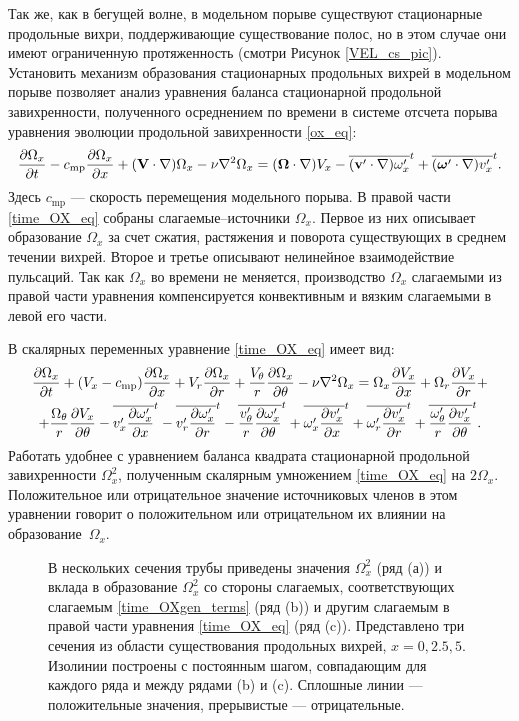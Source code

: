 Так же, как в бегущей волне, в модельном порыве существуют стационарные продольные  вихри, поддерживающие существование полос, но в этом случае они имеют ограниченную протяженность (смотри Рисунок \ref{VEL_cs_pic}). Установить механизм образования стационарных продольных вихрей в модельном порыве позволяет анализ уравнения баланса стационарной продольной завихренности, полученного осреднением по времени в системе отсчета порыва уравнения эволюции продольной завихренности \eqref{ox_eq}: 
\begin{equation} \label{time_OX_eq}
\frac{\partial \Omega_x}{\partial t} - c_\mathrm{mp} \frac{\partial \Omega_x}{\partial x} + (\mathbf{V} \cdot \nabla) \Omega_x - \nu\nabla^2 \Omega_x = (\mbox{\boldmath$\Omega$} \cdot \nabla) V_x - \overline{(\mathbf{v}' \cdot \nabla) \omega'_x}^t + \overline{(\mbox{\boldmath$\omega$}' \cdot \nabla) v'_x}^t.
\end{equation}
Здесь $c_\mathrm{mp}$ --- скорость перемещения модельного порыва. В правой части \eqref{time_OX_eq} собраны слагаемые--источники $\Omega_x$. Первое из них описывает образование $\Omega_x$ за счет сжатия, растяжения и поворота существующих в среднем течении вихрей. Второе и третье описывают нелинейное взаимодействие пульсаций. Так как $\Omega_x$ во времени не меняется, производство $\Omega_x$ слагаемыми из правой части уравнения компенсируется конвективным и вязким слагаемыми в левой его части. 

В скалярных переменных уравнение \eqref{time_OX_eq} имеет вид:
\begin{multline}\label{time_OX1_eq}
\frac{\partial \Omega_x}{\partial t} + (V_x - c_\mathrm{mp})\frac{\partial \Omega_x}{\partial x} + V_r \frac{\partial \Omega_x}{\partial r} + \frac{V_\theta}{r} \frac{\partial \Omega_x}{\partial \theta} - \nu\nabla^2\Omega_x= \Omega_x \frac{\partial V_x}{\partial x} + \Omega_r \frac{\partial V_x}{\partial r} + \\ + \frac{\Omega_\theta}{r} \frac{\partial V_x}{\partial \theta}
 - \overline{v'_x \frac{\partial \omega'_x}{\partial x}}^t - \overline{v'_r \frac{\partial \omega'_x}{\partial r}}^t - \overline{\frac{v'_\theta}{r} \frac{\partial \omega'_x}{\partial \theta}}^t
 + \overline{\omega'_x \frac{\partial v'_x}{\partial x}}^t + \overline{\omega'_r \frac{\partial v'_x}{\partial r}}^t + \overline{\frac{\omega'_\theta}{r} \frac{\partial v'_x}{\partial \theta}}^t.
\end{multline}
Работать удобнее с уравнением баланса квадрата стационарной продольной завихренности $\Omega_x^2$, полученным скалярным умножением \eqref{time_OX_eq} на $2\Omega_x$. Положительное или отрицательное значение источниковых членов в этом уравнении говорит о положительном или отрицательном их влиянии на образование~$\Omega_x$. 


\begin{figure}[h]
\caption{В нескольких сечения трубы приведены значения $\Omega_x^2$ (ряд (а)) и вклада в образование $\Omega_x^2$ со стороны слагаемых, соответствующих слагаемым \eqref{time_OXgen_terms} (ряд (b)) и другим слагаемым в правой части уравнения \eqref{time_OX_eq} (ряд (c)). Представлено три сечения из области существования продольных вихрей, $x=0,2.5,5$. Изолинии построены с постоянным шагом, совпадающим для каждого ряда и между рядами (b) и (c). Сплошные линии --- положительные значения, прерывистые --- отрицательные.}
\label{mp_OXgen_pic}
\end{figure}

